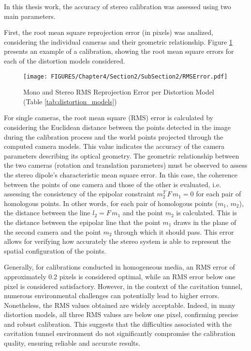 In this thesis work, the accuracy of stereo calibration was assessed using two main parameters.

First, the root mean square reprojection error (in pixels) was analized, considering the individual cameras and their geometric relationship. 
Figure \ref{fig:RMSError} presents an example of a calibration, showing the root mean square errors for each of the distortion models considered.

\begin{figure}[!h]
  \centering
  \texttt{[image: FIGURES/Chapter4/Section2/SubSection2/RMSError.pdf]}
  \caption{Mono and Stereo RMS Reprojection Error per Distortion Model (Table \ref{tab:distortion_models})}
  \label{fig:RMSError}  
\end{figure}

For single cameras, the root mean square (RMS) error is calculated by considering the Euclidean distance between the points detected in the image during the calibration process and  the world points projected through the computed camera models. This value indicates the accuracy of the camera parameters describing its optical geometry.
The geometric relationship between the two cameras (rotation and translation parameters) must be observed to assess the stereo dipole's characteristic mean square error.
In this case, the coherence between the points of one camera and those of the other is evaluated, i.e. assessing the consistency of the epipolar constraint $m_2^T \, F \, m_1 = 0$ for each pair of homologous points.
In other words, for each pair of homologous points ($m_1$, $m_2$), the distance between the line $l_2 = F \, m_1$ and the point $m_2$ is calculated. This is the distance between the epipolar line that the point $m_1$ draws in the plane of the second camera and the point $m_2$ through which it should pass. 
This error allows for verifying how accurately the stereo system is able to represent the spatial configuration of the points.

Generally, for calibrations conducted in homogeneous media, an RMS error of approximately $0.2$ pixels is considered optimal, while an RMS error below one pixel is considered satisfactory. However, in the context of the cavitation tunnel, numerous environmental challenges can potentially lead to higher errors. Nonetheless, the RMS values obtained are widely acceptable. Indeed, in many distortion models, all three RMS values are below one pixel, confirming precise and robust calibration. This suggests that the difficulties associated with the cavitation tunnel environment do not significantly compromise the calibration quality, ensuring reliable and accurate results.

